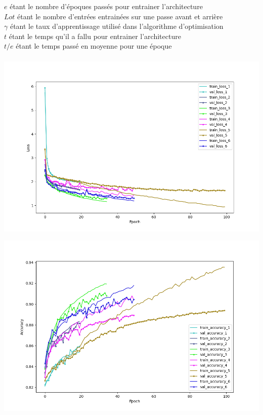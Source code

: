 \begin{multicols}{2}
{$e$ étant le nombre d'époques passés pour entrainer l'architecture \\

$Lot$ étant le nombre d'entrées entrainées sur une passe avant et arrière \\

$\gamma$ étant le taux d'apprentissage utilisé dans l'algorithme d'optimisation \\

$t$ étant le temps qu'il a fallu pour entrainer l'architecture \\

$t/e$ étant le temps passé en moyenne pour une époque \\
} \\

\includegraphics[width=\columnwidth]{images/cifar_10_losses.png}
\hfill\break

\includegraphics[width=\columnwidth]{images/cifar_10_accuracies.png}
\hfill\break


\end{multicols}
